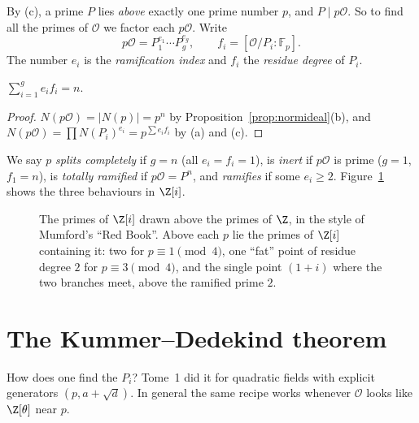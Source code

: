 By (c), a prime $P$ lies \emph{above} exactly one prime number $p$, and $P\mid p\mathcal O$. So to find all the primes of
$\mathcal O$ we factor each $p\mathcal O$. Write
\[
p\mathcal O=P_1^{e_1}\cdots P_g^{e_g},\qquad f_i=[\mathcal O/P_i:\mathbb F_p].
\]
The number $e_i$ is the \emph{ramification index} and $f_i$ the \emph{residue degree} of $P_i$.

\begin{theorem}\label{thm:sumef}
$\displaystyle\sum_{i=1}^ge_if_i=n$.
\end{theorem}
\begin{proof}
$N(p\mathcal O)=|N(p)|=p^n$ by Proposition~\ref{prop:normideal}(b), and $N(p\mathcal O)=\prod N(P_i)^{e_i}=p^{\sum
e_if_i}$ by (a) and (c).
\end{proof}

We say $p$ \emph{splits completely} if $g=n$ (all $e_i=f_i=1$), is \emph{inert} if $p\mathcal O$ is prime ($g=1$,
$f_1=n$), is \emph{totally ramified} if $p\mathcal O=P^n$, and \emph{ramifies} if some $e_i\ge2$. Figure~\ref{fig:spec}
shows the three behaviours in $\Z[i]$.

\begin{figure}[ht]
\centering
{}
\caption{The primes of $\Z[i]$ drawn above the primes of $\Z$, in the style of Mumford's ``Red Book''. Above each $p$
lie the primes of $\Z[i]$ containing it: two for $p\equiv1\pmod 4$, one ``fat'' point of residue degree $2$ for
$p\equiv3\pmod4$, and the single point $(1+i)$ where the two branches meet, above the ramified prime $2$.}
\label{fig:spec}
\end{figure}

\section{The Kummer--Dedekind theorem}

How does one find the $P_i$? Tome~1 did it for quadratic fields with explicit generators $(p,a+\sqrt d)$. In general
the same recipe works whenever $\mathcal O$ looks like $\Z[\theta]$ near $p$.

